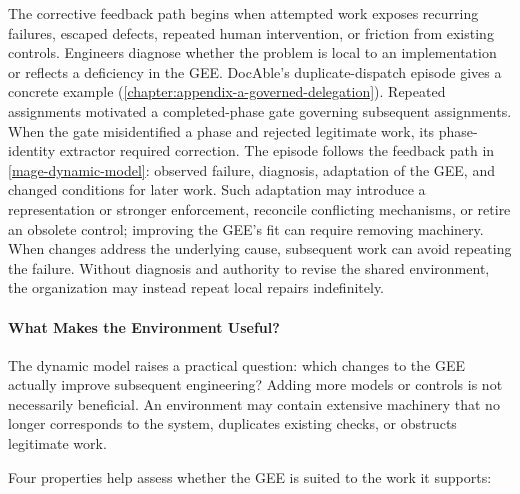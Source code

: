 
The corrective feedback path begins when attempted work exposes recurring failures, escaped defects, repeated human intervention, or friction from existing controls. Engineers diagnose whether the problem is local to an implementation or reflects a deficiency in the GEE. DocAble's duplicate-dispatch episode gives a concrete example (\autoref{chapter:appendix-a-governed-delegation}). Repeated assignments motivated a completed-phase gate governing subsequent assignments. When the gate misidentified a phase and rejected legitimate work, its phase-identity extractor required correction. The episode follows the feedback path in \autoref{mage-dynamic-model}: observed failure, diagnosis, adaptation of the GEE, and changed conditions for later work. Such adaptation may introduce a representation or stronger enforcement, reconcile conflicting mechanisms, or retire an obsolete control; improving the GEE's fit can require removing machinery. When changes address the underlying cause, subsequent work can avoid repeating the failure. Without diagnosis and authority to revise the shared environment, the organization may instead repeat local repairs indefinitely.



\paragraph{What Makes the Environment Useful?}

The dynamic model raises a practical question: which changes to the GEE actually improve subsequent engineering? Adding more models or controls is not necessarily beneficial. An environment may contain extensive machinery that no longer corresponds to the system, duplicates existing checks, or obstructs legitimate work.

Four properties help assess whether the GEE is suited to the work it supports:

